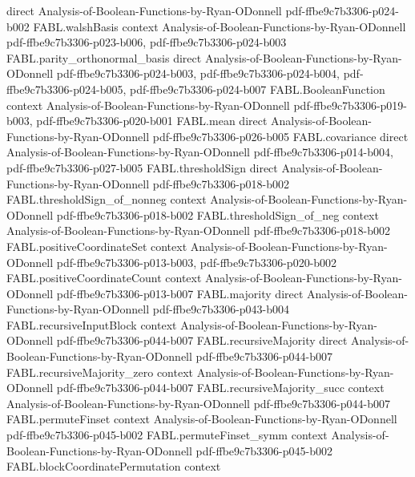 \begin{theorem}
  {direct}
  {Analysis-of-Boolean-Functions-by-Ryan-ODonnell}
  {pdf-ffbe9c7b3306-p024-b002}
\proofstep
  {FABL.walshBasis}
  {context}
  {Analysis-of-Boolean-Functions-by-Ryan-ODonnell}
  {pdf-ffbe9c7b3306-p023-b006,
    pdf-ffbe9c7b3306-p024-b003}
\proofstep
  {FABL.parity_orthonormal_basis}
  {direct}
  {Analysis-of-Boolean-Functions-by-Ryan-ODonnell}
  {pdf-ffbe9c7b3306-p024-b003,
    pdf-ffbe9c7b3306-p024-b004,
    pdf-ffbe9c7b3306-p024-b005,
    pdf-ffbe9c7b3306-p024-b007}
\proofstep
  {FABL.BooleanFunction}
  {context}
  {Analysis-of-Boolean-Functions-by-Ryan-ODonnell}
  {pdf-ffbe9c7b3306-p019-b003,
    pdf-ffbe9c7b3306-p020-b001}
\proofstep
  {FABL.mean}
  {direct}
  {Analysis-of-Boolean-Functions-by-Ryan-ODonnell}
  {pdf-ffbe9c7b3306-p026-b005}
\proofstep
  {FABL.covariance}
  {direct}
  {Analysis-of-Boolean-Functions-by-Ryan-ODonnell}
  {pdf-ffbe9c7b3306-p014-b004,
    pdf-ffbe9c7b3306-p027-b005}
\proofstep
  {FABL.thresholdSign}
  {direct}
  {Analysis-of-Boolean-Functions-by-Ryan-ODonnell}
  {pdf-ffbe9c7b3306-p018-b002}
\proofstep
  {FABL.thresholdSign_of_nonneg}
  {context}
  {Analysis-of-Boolean-Functions-by-Ryan-ODonnell}
  {pdf-ffbe9c7b3306-p018-b002}
\proofstep
  {FABL.thresholdSign_of_neg}
  {context}
  {Analysis-of-Boolean-Functions-by-Ryan-ODonnell}
  {pdf-ffbe9c7b3306-p018-b002}
\proofstep
  {FABL.positiveCoordinateSet}
  {context}
  {Analysis-of-Boolean-Functions-by-Ryan-ODonnell}
  {pdf-ffbe9c7b3306-p013-b003,
    pdf-ffbe9c7b3306-p020-b002}
\proofstep
  {FABL.positiveCoordinateCount}
  {context}
  {Analysis-of-Boolean-Functions-by-Ryan-ODonnell}
  {pdf-ffbe9c7b3306-p013-b007}
\proofstep
  {FABL.majority}
  {direct}
  {Analysis-of-Boolean-Functions-by-Ryan-ODonnell}
  {pdf-ffbe9c7b3306-p043-b004}
\proofstep
  {FABL.recursiveInputBlock}
  {context}
  {Analysis-of-Boolean-Functions-by-Ryan-ODonnell}
  {pdf-ffbe9c7b3306-p044-b007}
\proofstep
  {FABL.recursiveMajority}
  {direct}
  {Analysis-of-Boolean-Functions-by-Ryan-ODonnell}
  {pdf-ffbe9c7b3306-p044-b007}
\proofstep
  {FABL.recursiveMajority_zero}
  {context}
  {Analysis-of-Boolean-Functions-by-Ryan-ODonnell}
  {pdf-ffbe9c7b3306-p044-b007}
\proofstep
  {FABL.recursiveMajority_succ}
  {context}
  {Analysis-of-Boolean-Functions-by-Ryan-ODonnell}
  {pdf-ffbe9c7b3306-p044-b007}
\proofstep
  {FABL.permuteFinset}
  {context}
  {Analysis-of-Boolean-Functions-by-Ryan-ODonnell}
  {pdf-ffbe9c7b3306-p045-b002}
\proofstep
  {FABL.permuteFinset_symm}
  {context}
  {Analysis-of-Boolean-Functions-by-Ryan-ODonnell}
  {pdf-ffbe9c7b3306-p045-b002}
\proofstep
  {FABL.blockCoordinatePermutation}
  {context}

\end{theorem}
